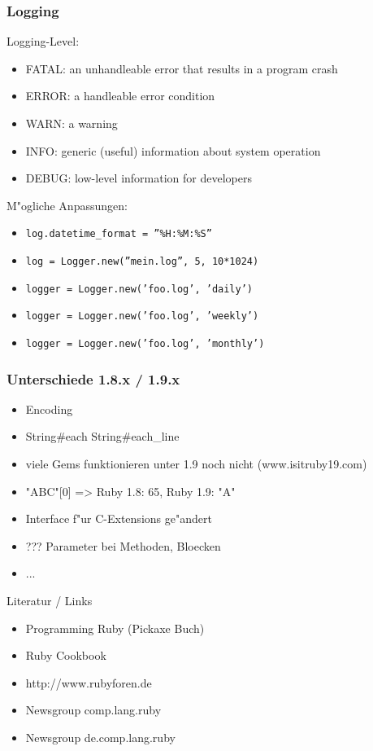 \documentclass{beamer}
\begin{document}
\begin{frame}
  \frametitle{Logging}
  Logging-Level:
  \begin{itemize}
    \item FATAL: an unhandleable error that results in a program crash
    \item ERROR: a handleable error condition
    \item WARN:	a warning
    \item INFO:	generic (useful) information about system operation
    \item DEBUG: low-level information for developers 
  \end{itemize}

  M"ogliche Anpassungen:
  \begin{itemize}
    \item \texttt{log.datetime\_format = ''\%H:\%M:\%S''}
    \item \texttt{log = Logger.new(''mein.log'', 5, 10*1024)}
    \item \texttt{logger = Logger.new('foo.log', 'daily')}
    \item \texttt{logger = Logger.new('foo.log', 'weekly')}
    \item \texttt{logger = Logger.new('foo.log', 'monthly')}
 
  \end{itemize}
\end{frame}

\begin{frame}
 \frametitle{Unterschiede 1.8.x / 1.9.x}
 \begin{itemize}
   \item<1->Encoding
   \item<2->String#each \arrow String#each_line
   \item<3->viele Gems funktionieren unter 1.9 noch nicht (www.isitruby19.com)
   \item<4->"ABC"[0] => Ruby 1.8: 65, Ruby 1.9: "A"
   \item<5->Interface f"ur C-Extensions ge"andert
   \item<6->??? Parameter bei Methoden, Bloecken
   \item ... 
 \end{itemize}

\end{frame}

\begin{frame}
  Literatur / Links
  \begin{itemize}
    \item Programming Ruby (Pickaxe Buch) 
    \item Ruby Cookbook
    \item http://www.rubyforen.de
    \item Newsgroup comp.lang.ruby 
    \item Newsgroup de.comp.lang.ruby 
  \end{itemize}
\end{frame}
\end{document}
